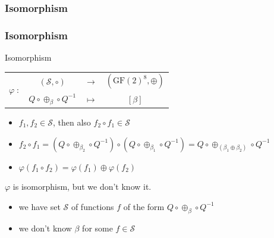 \documentclass{beamer}
\newcommand{\gf}{\ensuremath{\text{GF}\left(2\right)}}
\begin{document}
\subsubsection{Isomorphism}
\begin{frame}
    \frametitle{Isomorphism}
    \begin{block}{Isomorphism}
    \begin{center}
    \begin{tabular}{ r  c c c }
	\multirow{2}{*}{$\varphi \; :$} & $(\mathcal{S}, \circ )$  & $\longrightarrow$ & $(\gf^8, \oplus)$ \\
	                                & $Q \circ \oplus_{\beta} \circ Q^{-1} $ & $\longmapsto$ & $\left[ \beta \right]$
    \end{tabular}
    \end{center}
    
    \begin{itemize}
     \item $f_1, f_2 \in \mathcal{S}$, then also $f_2 \circ f_1 \in \mathcal{S}$ \pause
     \item $f_2 \circ f_1 = (Q \circ \oplus_{\beta_2} \circ Q^{-1}) \circ (Q \circ \oplus_{\beta_1} \circ Q^{-1}) = Q \circ \oplus_{(\beta_1 \oplus \beta_2)} \circ Q^{-1}$ \pause
     \item $\varphi(f_1 \circ f_2) = \varphi(f_1) \oplus \varphi(f_2)$ \pause
    \end{itemize}

\end{block}
    
    $\varphi$ is isomorphism, but we don't know it.
    \begin{itemize}
     \item we have set $\mathcal{S}$ of functions $f$ of the form $Q \circ \oplus_\beta \circ Q^{-1}$
     \item we don't know $\beta$ for some $f \in \mathcal{S}$
    \end{itemize}
\end{frame}
\end{document}
